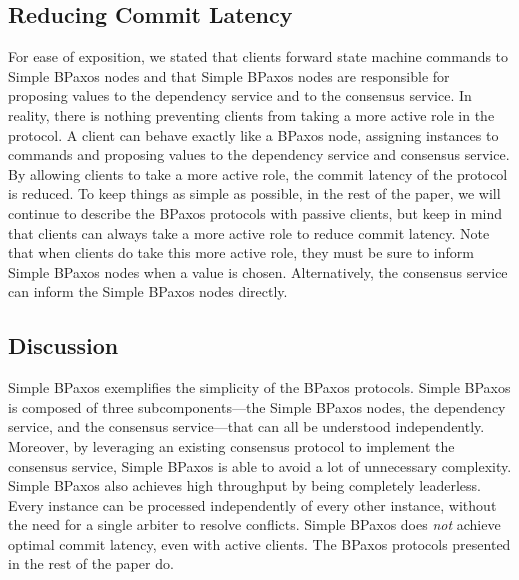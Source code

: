 \subsection{Reducing Commit Latency}
For ease of exposition, we stated that clients forward state machine commands
to Simple BPaxos nodes and that Simple BPaxos nodes are responsible for
proposing values to the dependency service and to the consensus service. In
reality, there is nothing preventing clients from taking a more active role in
the protocol. A client can behave exactly like a BPaxos node, assigning
instances to commands and proposing values to the dependency service and
consensus service.
%
By allowing clients to take a more active role, the commit latency of the
protocol is reduced. To keep things as simple as possible, in the rest of the
paper, we will continue to describe the BPaxos protocols with passive clients,
but keep in mind that clients can always take a more active role to reduce
commit latency.
%
Note that when clients do take this more active role, they must be sure to
inform Simple BPaxos nodes when a value is chosen. Alternatively, the
consensus service can inform the Simple BPaxos nodes directly.

\subsection{Discussion}
Simple BPaxos exemplifies the simplicity of the BPaxos protocols. Simple BPaxos
is composed of three subcomponents---the Simple BPaxos nodes, the dependency
service, and the consensus service---that can all be understood independently.
Moreover, by leveraging an existing consensus protocol to implement the
consensus service, Simple BPaxos is able to avoid a lot of unnecessary
complexity.
%
Simple BPaxos also achieves high throughput by being completely leaderless.
Every instance can be processed independently of every other instance, without
the need for a single arbiter to resolve conflicts.
%
Simple BPaxos does \emph{not} achieve optimal commit latency, even with active
clients. The BPaxos protocols presented in the rest of the paper do.
